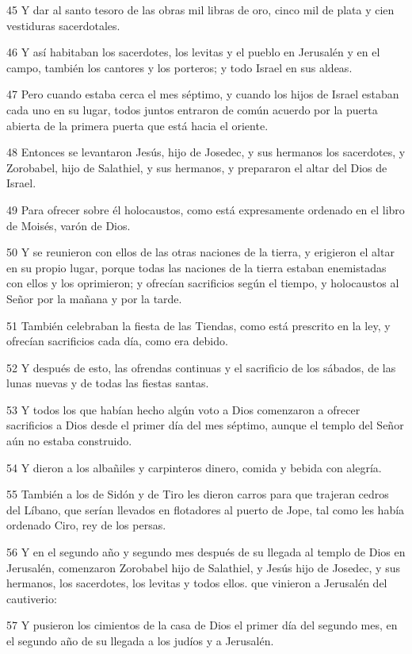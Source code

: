 \par 45 Y dar al santo tesoro de las obras mil libras de oro, cinco mil de plata y cien vestiduras sacerdotales.
\par 46 Y así habitaban los sacerdotes, los levitas y el pueblo en Jerusalén y en el campo, también los cantores y los porteros; y todo Israel en sus aldeas.
\par 47 Pero cuando estaba cerca el mes séptimo, y cuando los hijos de Israel estaban cada uno en su lugar, todos juntos entraron de común acuerdo por la puerta abierta de la primera puerta que está hacia el oriente.
\par 48 Entonces se levantaron Jesús, hijo de Josedec, y sus hermanos los sacerdotes, y Zorobabel, hijo de Salathiel, y sus hermanos, y prepararon el altar del Dios de Israel.
\par 49 Para ofrecer sobre él holocaustos, como está expresamente ordenado en el libro de Moisés, varón de Dios.
\par 50 Y se reunieron con ellos de las otras naciones de la tierra, y erigieron el altar en su propio lugar, porque todas las naciones de la tierra estaban enemistadas con ellos y los oprimieron; y ofrecían sacrificios según el tiempo, y holocaustos al Señor por la mañana y por la tarde.
\par 51 También celebraban la fiesta de las Tiendas, como está prescrito en la ley, y ofrecían sacrificios cada día, como era debido.
\par 52 Y después de esto, las ofrendas continuas y el sacrificio de los sábados, de las lunas nuevas y de todas las fiestas santas.
\par 53 Y todos los que habían hecho algún voto a Dios comenzaron a ofrecer sacrificios a Dios desde el primer día del mes séptimo, aunque el templo del Señor aún no estaba construido.
\par 54 Y dieron a los albañiles y carpinteros dinero, comida y bebida con alegría.
\par 55 También a los de Sidón y de Tiro les dieron carros para que trajeran cedros del Líbano, que serían llevados en flotadores al puerto de Jope, tal como les había ordenado Ciro, rey de los persas.
\par 56 Y en el segundo año y segundo mes después de su llegada al templo de Dios en Jerusalén, comenzaron Zorobabel hijo de Salathiel, y Jesús hijo de Josedec, y sus hermanos, los sacerdotes, los levitas y todos ellos. que vinieron a Jerusalén del cautiverio:
\par 57 Y pusieron los cimientos de la casa de Dios el primer día del segundo mes, en el segundo año de su llegada a los judíos y a Jerusalén.
